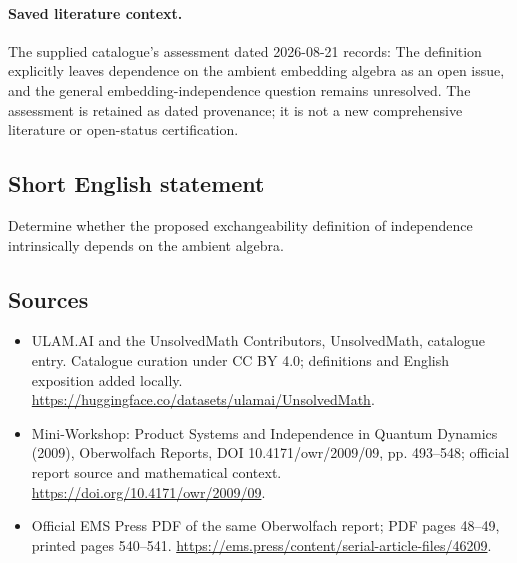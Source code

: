 \documentclass[11pt]{article}
\begin{document}
\paragraph{Saved literature context.} The supplied catalogue's assessment dated 2026-08-21 records: The definition explicitly leaves dependence on the ambient embedding algebra as an open issue, and the general embedding-independence question remains unresolved. The assessment is retained as dated provenance; it is not a new comprehensive literature or open-status certification.
\subsection{Short English statement}
Determine whether the proposed exchangeability definition of independence intrinsically depends on the ambient algebra.
\subsection{Sources}
\begin{itemize}
\item[\hypertarget{source:statement:1}{S1}] ULAM.AI and the UnsolvedMath Contributors, UnsolvedMath, catalogue entry. Catalogue curation under CC BY 4.0; definitions and English exposition added locally.
\url{https://huggingface.co/datasets/ulamai/UnsolvedMath}.
\item[\hypertarget{source:statement:2}{S2}] Mini-Workshop: Product Systems and Independence in Quantum Dynamics (2009), Oberwolfach Reports, DOI 10.4171/owr/2009/09, pp. 493--548; official report source and mathematical context.
\url{https://doi.org/10.4171/owr/2009/09}.
\item[\hypertarget{source:statement:3}{S3}] Official EMS Press PDF of the same Oberwolfach report; PDF pages 48--49, printed pages 540--541.
\url{https://ems.press/content/serial-article-files/46209}.
\end{itemize}
\label{end:statement}
\end{document}
